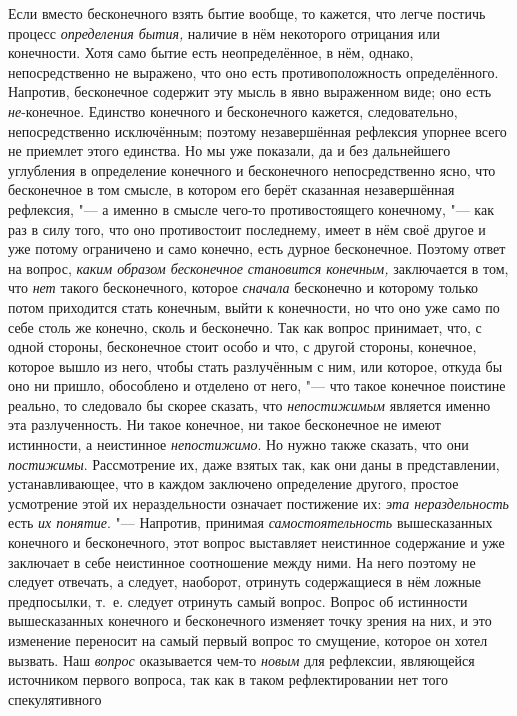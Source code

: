 Если вместо бесконечного взять бытие вообще, то кажется, что легче постичь
процесс {\em определения бытия,} наличие в нём
некоторого отрицания или конечности. Хотя само бытие есть неопределённое, в
нём, однако, непосредственно не выражено, что оно есть противоположность
определённого. Напротив, бесконечное содержит эту мысль в явно выраженном
виде; оно есть {\em не}{}-конечное. Единство конечного
и бесконечного кажется, следовательно, непосредственно исключённым; поэтому
незавершённая рефлексия упорнее всего не приемлет этого единства. Но мы уже
показали, да и без дальнейшего углубления в определение конечного и
бесконечного непосредственно ясно, что бесконечное в том смысле, в котором
его берёт сказанная незавершённая рефлексия, "--- а именно в смысле чего-то
противостоящего конечному, "--- как раз в силу того, что оно противостоит
последнему, имеет в нём своё другое и уже потому ограничено и само конечно,
есть дурное бесконечное. Поэтому ответ на вопрос,
{\em каким образом бесконечное становится конечным,}
заключается в том, что {\em нет} такого бесконечного,
которое {\em сначала} бесконечно и которому только
потом приходится стать конечным, выйти к конечности, но что оно уже само по
себе столь же конечно, сколь и бесконечно. Так как вопрос принимает, что, с
одной стороны, бесконечное стоит особо и что, с другой стороны, конечное,
которое вышло из него, чтобы стать разлучённым с ним, или которое, откуда
бы оно ни пришло, обособлено и отделено от него, "--- что такое конечное
поистине реально, то следовало бы скорее сказать, что
{\em непостижимым} является именно эта разлученность.
Ни такое конечное, ни такое бесконечное не имеют истинности, а неистинное
{\em непостижимо}. Но нужно также сказать, что они
{\em постижимы}. Рассмотрение их, даже взятых так, как
они даны в представлении, устанавливающее, что в каждом заключено
определение другого, простое усмотрение этой их нераздельности означает
постижение их: {\em эта нераздельность} есть
{\em их понятие}. "--- Напротив, принимая
{\em самостоятельность} вышесказанных конечного и
бесконечного, этот вопрос выставляет неистинное содержание и уже заключает
в себе неистинное соотношение между ними. На него поэтому не следует
отвечать, а следует, наоборот, отринуть содержащиеся в нём ложные
предпосылки, т.~е. следует отринуть самый вопрос. Вопрос об истинности
вышесказанных конечного и бесконечного изменяет точку зрения на них, и это
изменение переносит на самый первый вопрос то смущение, которое он хотел
вызвать. Наш {\em вопрос} оказывается чем-то
{\em новым} для рефлексии, являющейся источником
первого вопроса, так как в таком рефлектировании нет того спекулятивного
